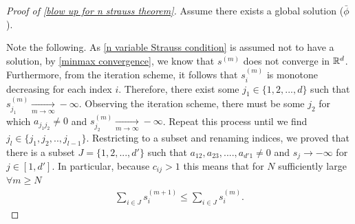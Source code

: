 \documentclass[11pt, oneside]{amsart}
\begin{document}
	
	\begin{proof}[Proof of \cref{blow up for n strauss theorem}] 
		Assume there exists a global solution ($\bar{\phi}$). 
		
		Note the following. As \cref{n variable Strauss condition} is assumed not to have a solution, by \cref{minmax convergence}, we know that $s^{(m)}$ does not converge in $\mathbb{R}^d$. Furthermore, from the iteration scheme, it follows that $s^{(m)}_i$ is monotone decreasing for each index $i$. Therefore, there exist some $j_1\in\{1,2,...,d\}$ such that $s_{j_1}^{(m)}\underset{m\to\infty}{\to}-\infty$. Observing the iteration scheme, there must be some $j_2$ for which $a_{j_1j_2}\neq0$ and $s_{j_2}^{(m)}\underset{m\to\infty}{\to}-\infty$. Repeat this process until we find $j_l\in\{j_1,j_2,..,j_{l-1}\}$. Restricting to a subset and renaming indices, we proved that there is a subset $J=\{1,2,...,d'\}$ such that $a_{12},a_{23},....,a_{d'1}\neq0$ and $s_j\to -\infty$ for $j\in[1,d']$. In particular, because $c_{ij}>1$ this means that for $N$ sufficiently large $\forall m\geq N$
		\begin{equation*}
			\begin{gathered}
				\sum_{i\in J}s_i^{(m+1)}\leq \sum_{i\in J}s_i^{(m)}.
			\end{gathered}
		\end{equation*}
		

\end{proof}
\end{document}

